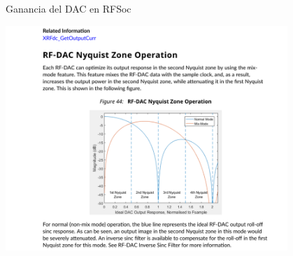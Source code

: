\documentclass[ignorenonframetext,12pt]{beamer}
\begin{document}
\begin{frame}{Ganancia del DAC en RFSoc}
				\begin{center}
								\includegraphics[width=0.8\textwidth]{dac_gain}
				\end{center}
\end{frame}
\end{document}

